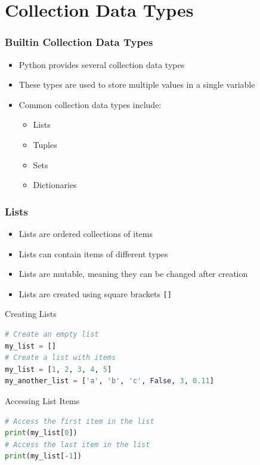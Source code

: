 \section{Collection Data Types}
\begin{frame}
    \frametitle{Builtin Collection Data Types}
    \begin{itemize}
        \item Python provides several collection data types
        \item These types are used to store multiple values in a single variable
        \item Common collection data types include:
        \begin{itemize}
            \item Lists
            \item Tuples
            \item Sets
            \item Dictionaries
        \end{itemize}
    \end{itemize}   
\end{frame}

\begin{frame}
    \frametitle{Lists}
    \begin{itemize}
        \item Lists are ordered collections of items
        \item Lists can contain items of different types
        \item Lists are mutable, meaning they can be changed after creation
        \item Lists are created using square brackets \texttt{[]}
    \end{itemize}
\end{frame}

\begin{frame}[fragile]{Creating Lists}
    \begin{lstlisting}[language=Python]
# Create an empty list
my_list = []
# Create a list with items
my_list = [1, 2, 3, 4, 5]  
my_another_list = ['a', 'b', 'c', False, 3, 0.11]  
    \end{lstlisting}
\end{frame}

\begin{frame}[fragile]{Accessing List Items}
    \begin{lstlisting}[language=Python]
# Access the first item in the list
print(my_list[0])
# Access the last item in the list
print(my_list[-1])
    \end{lstlisting}
\end{frame} 

